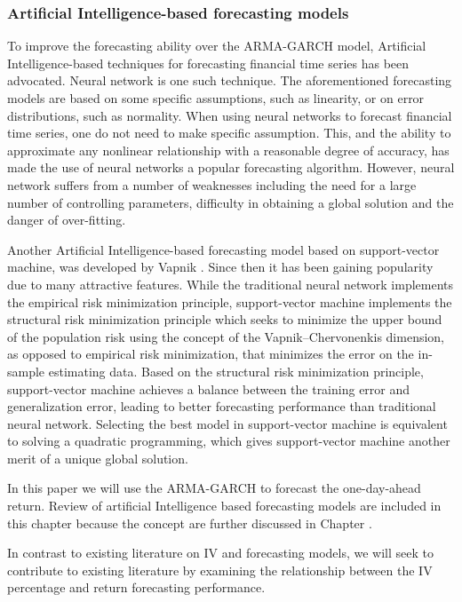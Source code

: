 \subsubsection{Artificial Intelligence-based forecasting models}

To improve the forecasting ability over the ARMA-GARCH model, Artificial Intelligence-based techniques for forecasting financial time series has been advocated. Neural network is one such technique. The aforementioned forecasting models are based on some specific assumptions, such as linearity, or on error distributions, such as normality. When using neural networks to forecast financial time series, one do not need to make specific assumption. This, and the ability to approximate any nonlinear relationship with a reasonable degree of accuracy, has made the use of neural networks a popular forecasting algorithm. However, neural network suffers from a number of weaknesses including the need for a large number of controlling parameters, difficulty in obtaining a global solution and the danger of over-fitting.

Another Artificial Intelligence-based forecasting model based on support-vector machine, was developed by Vapnik \cite{Vapnik1}\cite{Vapnik2}. Since then it has been gaining popularity due to many attractive features. While the traditional neural network implements the empirical risk minimization principle, support-vector machine implements the structural risk minimization principle which seeks to minimize the upper bound of the population risk using the concept of the Vapnik–Chervonenkis dimension, as opposed to empirical risk minimization, that minimizes the error on the in-sample estimating data. Based on the structural risk minimization principle, support-vector machine achieves a balance between the training error and generalization error, leading to better forecasting performance than traditional neural network. Selecting the best model in support-vector machine is equivalent to solving a quadratic programming, which gives support-vector machine another merit of a unique global solution. 

In this paper we will use the ARMA-GARCH to forecast the one-day-ahead return. Review of artificial Intelligence based forecasting models are included in this chapter because the concept are further discussed in Chapter \label{FutureWork}.

In contrast to existing literature on IV and forecasting models, we will seek to contribute to existing literature by examining the relationship between the IV percentage and return forecasting performance. 
